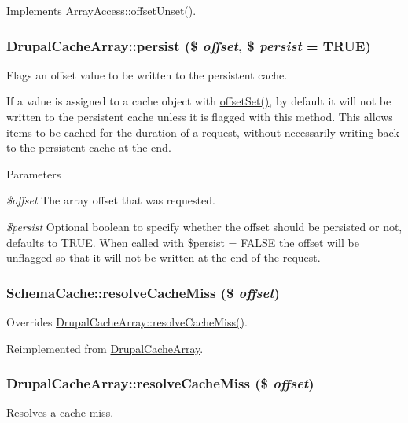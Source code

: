 \label{group__schemaapi_ga8bb43551e89c35590c56a49f8fb54e3f}
Implements ArrayAccess::offsetUnset(). \hypertarget{group__schemaapi_ga27687007f42979bdb8999683f3270c4a}{
\subsubsection[{persist}]{\setlength{\rightskip}{0pt plus 5cm}DrupalCacheArray::persist (\$ {\em offset}, \/  \$ {\em persist} = {\ttfamily TRUE})}}
\label{group__schemaapi_ga27687007f42979bdb8999683f3270c4a}
Flags an offset value to be written to the persistent cache.

If a value is assigned to a cache object with \hyperlink{group__schemaapi_ga0d3377e6f4b8c592f006a75f8eadf21a}{offsetSet()}, by default it will not be written to the persistent cache unless it is flagged with this method. This allows items to be cached for the duration of a request, without necessarily writing back to the persistent cache at the end.


\begin{DoxyParams}{Parameters}
\item[{\em \$offset}]The array offset that was requested. \item[{\em \$persist}]Optional boolean to specify whether the offset should be persisted or not, defaults to TRUE. When called with \$persist = FALSE the offset will be unflagged so that it will not be written at the end of the request. \end{DoxyParams}
\hypertarget{group__schemaapi_gadb0a973c0269c37d3389946d5b57c01c}{
\subsubsection[{resolveCacheMiss}]{\setlength{\rightskip}{0pt plus 5cm}SchemaCache::resolveCacheMiss (\$ {\em offset})}}
\label{group__schemaapi_gadb0a973c0269c37d3389946d5b57c01c}
Overrides \hyperlink{group__schemaapi_ga33d892a839b353177e2483f6946178e9}{DrupalCacheArray::resolveCacheMiss()}. 

Reimplemented from \hyperlink{group__schemaapi_ga33d892a839b353177e2483f6946178e9}{DrupalCacheArray}.\hypertarget{group__schemaapi_ga33d892a839b353177e2483f6946178e9}{
\subsubsection[{resolveCacheMiss}]{\setlength{\rightskip}{0pt plus 5cm}DrupalCacheArray::resolveCacheMiss (\$ {\em offset})}}
\label{group__schemaapi_ga33d892a839b353177e2483f6946178e9}
Resolves a cache miss.

